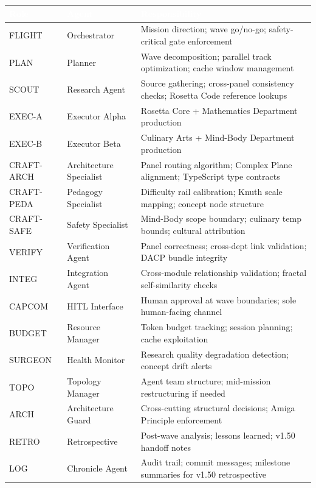 \documentclass[11pt,letterpaper]{article}
\newcommand{\tableheader}[1]{\textbf{\sffamily\textcolor{white}{#1}}}
\begin{document}
\begin{center}
\begin{tabularx}{\textwidth}{L{2.2cm}L{3.5cm}X}
\toprule
{}
\tableheader{Role} & \tableheader{Agent} & \tableheader{Responsibility} \\
\midrule
FLIGHT & Orchestrator & Mission direction; wave go/no-go; safety-critical gate enforcement \\
PLAN & Planner & Wave decomposition; parallel track optimization; cache window management \\
SCOUT & Research Agent & Source gathering; cross-panel consistency checks; Rosetta Code reference lookups \\
EXEC-A & Executor Alpha & Rosetta Core + Mathematics Department production \\
EXEC-B & Executor Beta & Culinary Arts + Mind-Body Department production \\
CRAFT-ARCH & Architecture Specialist & Panel routing algorithm; Complex Plane alignment; TypeScript type contracts \\
CRAFT-PEDA & Pedagogy Specialist & Difficulty rail calibration; Knuth scale mapping; concept node structure \\
CRAFT-SAFE & Safety Specialist & Mind-Body scope boundary; culinary temp bounds; cultural attribution \\
VERIFY & Verification Agent & Panel correctness; cross-dept link validation; DACP bundle integrity \\
INTEG & Integration Agent & Cross-module relationship validation; fractal self-similarity checks \\
CAPCOM & HITL Interface & Human approval at wave boundaries; sole human-facing channel \\
BUDGET & Resource Manager & Token budget tracking; session planning; cache exploitation \\
SURGEON & Health Monitor & Research quality degradation detection; concept drift alerts \\
TOPO & Topology Manager & Agent team structure; mid-mission restructuring if needed \\
ARCH & Architecture Guard & Cross-cutting structural decisions; Amiga Principle enforcement \\
RETRO & Retrospective & Post-wave analysis; lessons learned; v1.50 handoff notes \\
LOG & Chronicle Agent & Audit trail; commit messages; milestone summaries for v1.50 retrospective \\
\bottomrule
\end{tabularx}
\end{center}
\end{document}
